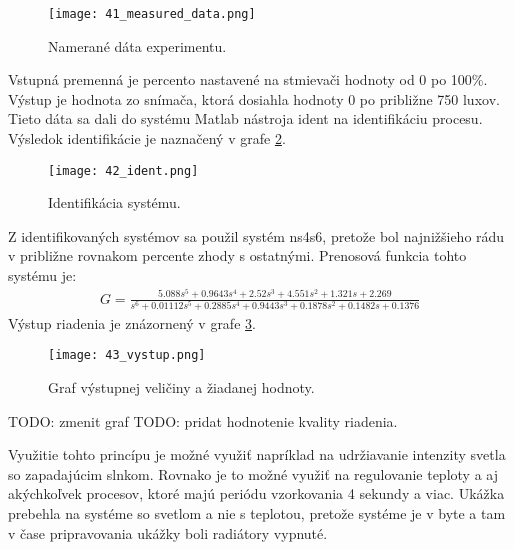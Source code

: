 \begin{figure}[h]
\centering
\texttt{[image: 41\_measured\_data.png]}
\caption{Namerané dáta experimentu.}
\label{41_measured_data}
\end{figure}
Vstupná premenná je percento nastavené na stmievači hodnoty od 0 po 100\%. Výstup je hodnota zo snímača, ktorá dosiahla hodnoty 0 po približne 750 luxov. Tieto dáta sa dali do systému Matlab nástroja ident  na identifikáciu procesu. Výsledok identifikácie je naznačený v grafe \ref{42_ident}.
\begin{figure}[h]
\centering
\texttt{[image: 42\_ident.png]}
\caption{Identifikácia systému.}
\label{42_ident}
\end{figure}
Z identifikovaných systémov sa použil systém ns4s6, pretože bol najnižšieho rádu v približne rovnakom percente zhody s ostatnými. Prenosová funkcia tohto systému je:
\begin{equation} \label{eq40}
\begin{split}
 G = \frac{5.088 s^5 + 0.9643 s^4 + 2.52 s^3 + 4.551 s^2 + 1.321 s + 2.269}{  s^6 + 0.01112 s^5 + 0.2885 s^4 + 0.9443 s^3 + 0.1878 s^2 + 0.1482 s + 0.1376}
\end{split}
\end{equation}
Výstup riadenia je znázornený v grafe \ref{43_vystup}.
\begin{figure}[h]
\centering
\texttt{[image: 43\_vystup.png]}
\caption{Graf výstupnej veličiny a žiadanej hodnoty.}
\label{43_vystup}
\end{figure}
TODO: zmenit graf
TODO: pridat hodnotenie kvality riadenia.

Využitie tohto princípu je možné využiť napríklad na udržiavanie intenzity svetla so zapadajúcim slnkom. Rovnako je to možné využiť na regulovanie teploty a aj akýchkoľvek procesov, ktoré majú periódu vzorkovania 4 sekundy a viac. Ukážka prebehla na systéme so svetlom a nie s teplotou, pretože systéme je v byte a tam v čase pripravovania ukážky boli radiátory vypnuté.